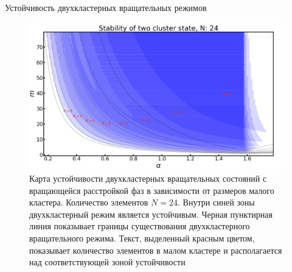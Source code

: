 \begin{chapter}{Устойчивость двухкластерных вращательных режимов}
	\begin{figure}[h!]
		\begin{center}
			\includegraphics[width=1\columnwidth]{pictures/st-map.png}
		\end{center}
		\caption{Карта устойчивости двухкластерных вращательных состояний с вращающейся расстройкой фаз в зависимости от размеров малого кластера.
		Количество элементов $N = 24$. Внутри синей зоны двухкластерный режим является устойчивым. Черная пунктирная линия показывает
		границы существования двухкластерного вращательного режима. Текст, выделенный красным цветом, показывает количество элементов в малом
		кластере и располагается над соответствующей зоной устойчивости}
		\label{su-map}
	\end{figure}

\end{chapter}